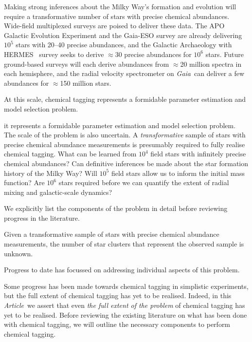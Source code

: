 \documentclass{aastex61}
\newcommand{\article}{\emph{Article}}
\newcommand{\acronym}[1]{{\small{#1}}}
\newcommand{\project}[1]{\textsl{#1}}
\newcommand{\apogee}{\acronym{APOGEE}}
\newcommand{\ges}{\acronym{GES}}
\newcommand{\hermes}{\acronym{HERMES}}
\newcommand{\galah}{\acronym{GALAH}}
\newcommand{\fourmost}{\acronym{4MOST}}
\newcommand{\weave}{\acronym{WEAVE}}
\newcommand{\gaia}{\project{Gaia}}
\begin{document}

Making strong inferences about the Milky Way's formation and evolution will
require a transformative number of stars with precise chemical abundances.
Wide-field multiplexed surveys are poised to deliver these data. 
The APO Galactic Evolution Experiment \citep[\apogee, e.g.,][]{apogee} and the 
Gaia-ESO survey \citep[\ges;][]{Gilmore_2012,Randich_2013} are already 
delivering $10^5$ stars with 20--40 precise abundances, and the Galactic
Archaeology with \hermes\ \citep[\galah;][]{DeSilva_2015} survey seeks to
derive $\approx$30 precise abundances for $10^6$ stars.
Future ground-based surveys will each derive abundances from $\approx$20
million spectra \citep[e.g., \weave, \fourmost;][]{weave,4most} in each
hemisphere, and the radial velocity spectrometer on \gaia\ can deliver a few
abundances for $\approx$150 million stars.



At this scale, chemical tagging represents a formidable parameter estimation
and model selection problem.


it represents a formidable parameter
estimation and model selection problem.
The scale of the problem is also uncertain.
A \emph{transformative} sample of stars with precise chemical abundance
measurements is presumably required to fully realise chemical tagging.
What can be learned from $10^4$ field stars with infinitely precise chemical
abundances? Can definitive inferences be made about the star formation history
of the Milky Way? Will $10^5$ field stars allow us to inform the initial mass
function? Are $10^6$ stars required before we can quantify the extent of
radial mixing and galactic-scale dynamics?




We explicitly list the components of the problem in detail before
reviewing progress in the literature.

Given a transformative sample of stars with precise chemical abundance
measurements, the number of star clusters that represent the observed sample is
unknown. 




Progress to date has focussed on addressing individual aspects of this problem.



Some progress has been made towards chemical tagging in simplistic experiments, 
but the full extent of chemical tagging has yet to be realised. Indeed, in this 
\article\ we assert that even \emph{the full extent of the problem} of chemical 
tagging has yet to be realised. Before reviewing the existing literature on
what has been done with chemical tagging, we will outline the necessary
components to perform chemical tagging.
\end{document}
